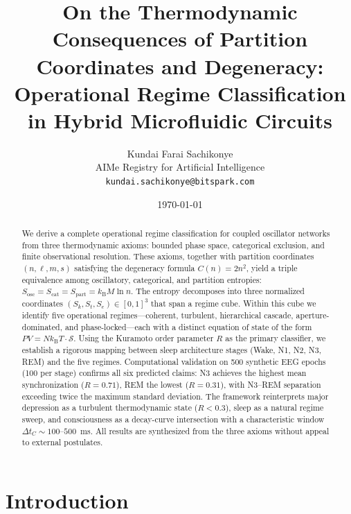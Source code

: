 \documentclass[aps,prd,twocolumn,superscriptaddress,floatfix,nofootinbib]{revtex4-2}
\theoremstyle{remark}
\newcommand{\kB}{k_{\mathrm{B}}}
\newcommand{\Sk}{S_k}
\newcommand{\St}{S_t}
\newcommand{\Se}{S_e}
\newcommand{\Sosc}{S_{\mathrm{osc}}}
\newcommand{\Scat}{S_{\mathrm{cat}}}
\newcommand{\Spart}{S_{\mathrm{part}}}
\newcommand{\Rorder}{R}
\newcommand{\Sregime}{\mathcal{S}}
\begin{document}
\title{On the Thermodynamic Consequences of Partition Coordinates and Degeneracy: Operational Regime Classification in Hybrid Microfluidic Circuits}

\author{
Kundai Farai Sachikonye\\
AIMe Registry for Artificial Intelligence\\
\texttt{kundai.sachikonye@bitspark.com}
}

\date{\today}

\begin{abstract}
We derive a complete operational regime classification for coupled oscillator networks from three thermodynamic axioms: bounded phase space, categorical exclusion, and finite observational resolution. These axioms, together with partition coordinates $(n, \ell, m, s)$ satisfying the degeneracy formula $C(n) = 2n^2$, yield a triple equivalence among oscillatory, categorical, and partition entropies: $\Sosc = \Scat = \Spart = \kB M \ln n$. The entropy decomposes into three normalized coordinates $(\Sk, \St, \Se) \in [0,1]^3$ that span a regime cube. Within this cube we identify five operational regimes---coherent, turbulent, hierarchical cascade, aperture-dominated, and phase-locked---each with a distinct equation of state of the form $PV = N\kB T \cdot \Sregime$. Using the Kuramoto order parameter $\Rorder$ as the primary classifier, we establish a rigorous mapping between sleep architecture stages (Wake, N1, N2, N3, REM) and the five regimes. Computational validation on 500 synthetic EEG epochs (100 per stage) confirms all six predicted claims: N3 achieves the highest mean synchronization ($\Rorder = 0.71$), REM the lowest ($\Rorder = 0.31$), with N3--REM separation exceeding twice the maximum standard deviation. The framework reinterprets major depression as a turbulent thermodynamic state ($\Rorder < 0.3$), sleep as a natural regime sweep, and consciousness as a decay-curve intersection with a characteristic window $\Delta t_C \sim 100$--$500$~ms. All results are synthesized from the three axioms without appeal to external postulates.
\end{abstract}

\maketitle

\section{Introduction}
\label{sec:introduction}
\end{document}
